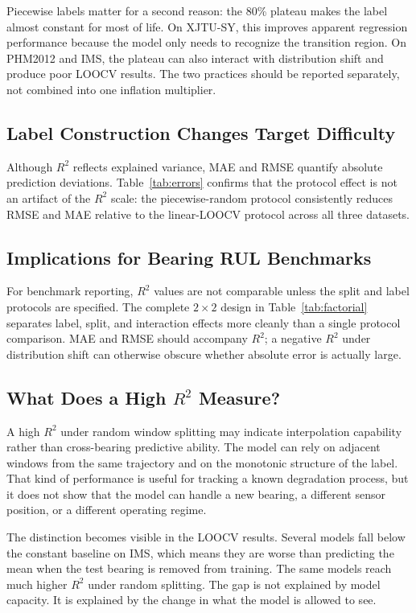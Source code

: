 \documentclass[5p,twocolumn]{elsarticle}
\begin{document}
Piecewise labels matter for a second reason: the 80\% plateau makes the label almost constant for most of life. On XJTU-SY, this improves apparent regression performance because the model only needs to recognize the transition region. On PHM2012 and IMS, the plateau can also interact with distribution shift and produce poor LOOCV results. The two practices should be reported separately, not combined into one inflation multiplier.
\subsection{Label Construction Changes Target Difficulty}

Although $R^2$ reflects explained variance, MAE and RMSE quantify absolute prediction deviations. Table~\ref{tab:errors} confirms that the protocol effect is not an artifact of the $R^2$ scale: the piecewise-random protocol consistently reduces RMSE and MAE relative to the linear-LOOCV protocol across all three datasets.

\subsection{Implications for Bearing RUL Benchmarks}
For benchmark reporting, $R^2$ values are not comparable unless the split and label protocols are specified. The complete $2 \times 2$ design in Table~\ref{tab:factorial} separates label, split, and interaction effects more cleanly than a single protocol comparison. MAE and RMSE should accompany $R^2$; a negative $R^2$ under distribution shift can otherwise obscure whether absolute error is actually large.

\subsection{What Does a High $R^2$ Measure?}
A high $R^2$ under random window splitting may indicate interpolation capability rather than cross-bearing predictive ability. The model can rely on adjacent windows from the same trajectory and on the monotonic structure of the label. That kind of performance is useful for tracking a known degradation process, but it does not show that the model can handle a new bearing, a different sensor position, or a different operating regime.

The distinction becomes visible in the LOOCV results. Several models fall below the constant baseline on IMS, which means they are worse than predicting the mean when the test bearing is removed from training. The same models reach much higher $R^2$ under random splitting. The gap is not explained by model capacity. It is explained by the change in what the model is allowed to see.
\end{document}
